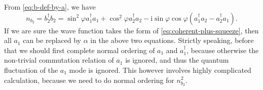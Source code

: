 \documentclass[hyperref, a4paper]{article}
\newcommand*{\ii}{\mathrm{i}}
\begin{document}
From \eqref{eq:b-def-by-a}, we have 
\begin{equation}
    n_{b_2} = b_2^\dagger b_2 = 
    \sin^2 \varphi a_1^\dagger a_1 + \cos^2 \varphi a_2^\dagger a_2
    - \ii \sin \varphi \cos \varphi (a_1^\dagger a_2 - a_2^\dagger a_1).
    \label{eq:nb2-a}
\end{equation}
If we are sure the wave function takes the form of \eqref{eq:coherent-plus-squeeze},
then all $a_1$ can be replaced by $\alpha$ in the above two equations.
Strictly speaking, before that we should first complete normal ordering of $a_1$ and $a_1^\dagger$,
because otherwise the non-trivial commutation relation of $a_1$ is ignored,
and thus the quantum fluctuation of the $a_1$ mode is ignored.
This however involves highly complicated calculation,
because we need to do normal ordering for $n_{b_2}^2$.
\end{document}
